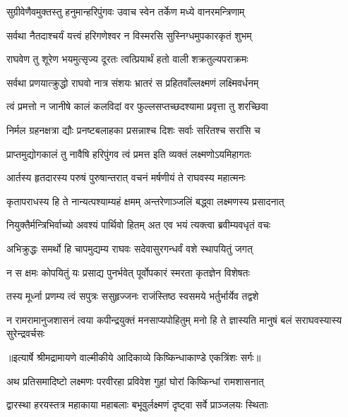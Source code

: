 \twolineshloka
{सुग्रीवेणैवमुक्तस्तु हनुमान्हरिपुंगवः}
{उवाच स्वेन तर्केण मध्ये वानरमन्त्रिणाम्} %

\twolineshloka
{सर्वथा नैतदाश्चर्यं यत्त्वं हरिगणेश्वर}
{न विस्मरसि सुस्निग्धमुपकारकृतं शुभम्} %

\twolineshloka
{राघवेण तु शूरेण भयमुत्सृज्य दूरतः}
{त्वत्प्रियार्थं हतो वाली शक्रतुल्यपराक्रमः} %

\twolineshloka
{सर्वथा प्रणयात्क्रुद्धो राघवो नात्र संशयः}
{भ्रातरं स प्रहितवाँल्लक्ष्मणं लक्ष्मिवर्धनम्} %

\twolineshloka
{त्वं प्रमत्तो न जानीषे कालं कलविदां वर}
{फुल्लसप्तच्छदश्यामा प्रवृत्ता तु शरच्छिवा} %

\twolineshloka
{निर्मल ग्रहनक्षत्रा द्यौः प्रनष्टबलाहका}
{प्रसन्नाश्च दिशः सर्वाः सरितश्च सरांसि च} %

\twolineshloka
{प्राप्तमुद्योगकालं तु नावैषि हरिपुंगव}
{त्वं प्रमत्त इति व्यक्तं लक्ष्मणोऽयमिहागतः} %

\twolineshloka
{आर्तस्य हृतदारस्य परुषं पुरुषान्तरात्}
{वचनं मर्षणीयं ते राघवस्य महात्मनः} %

\twolineshloka
{कृतापराधस्य हि ते नान्यत्पश्याम्यहं क्षमम्}
{अन्तरेणाञ्जलिं बद्ध्वा लक्ष्मणस्य प्रसादनात्} %

\twolineshloka
{नियुक्तैर्मन्त्रिभिर्वाच्यो अवश्यं पार्थिवो हितम्}
{अत एव भयं त्यक्त्वा ब्रवीम्यवधृतं वचः} %

\twolineshloka
{अभिक्रुद्धः समर्थो हि चापमुद्यम्य राघवः}
{सदेवासुरगन्धर्वं वशे स्थापयितुं जगत्} %

\twolineshloka
{न स क्षमः कोपयितुं यः प्रसाद्य पुनर्भवेत्}
{पूर्वोपकारं स्मरता कृतज्ञेन विशेषतः} %

\twolineshloka
{तस्य मूर्ध्ना प्रणम्य त्वं सपुत्रः ससुहृज्जनः}
{राजंस्तिष्ठ स्वसमये भर्तुर्भार्येव तद्वशे} %

\fourlineindentedshloka
{न रामरामानुजशासनं त्वया}
{ कपीन्द्रयुक्तं मनसाप्यपोहितुम्}
{मनो हि ते ज्ञास्यति मानुषं बलं}
{ सराघवस्यास्य सुरेन्द्रवर्चसः} %


{॥इत्यार्षे श्रीमद्रामायणे वाल्मीकीये आदिकाव्ये किष्किन्धाकाण्डे एकत्रिंशः सर्गः॥}


\twolineshloka
{अथ प्रतिसमादिष्टो लक्ष्मणः परवीरहा}
{प्रविवेश गुहां घोरां किष्किन्धां रामशासनात्} %

\twolineshloka
{द्वारस्था हरयस्तत्र महाकाया महाबलाः}
{बभूवुर्लक्ष्मणं दृष्ट्वा सर्वे प्राञ्जलयः स्थिताः} %

